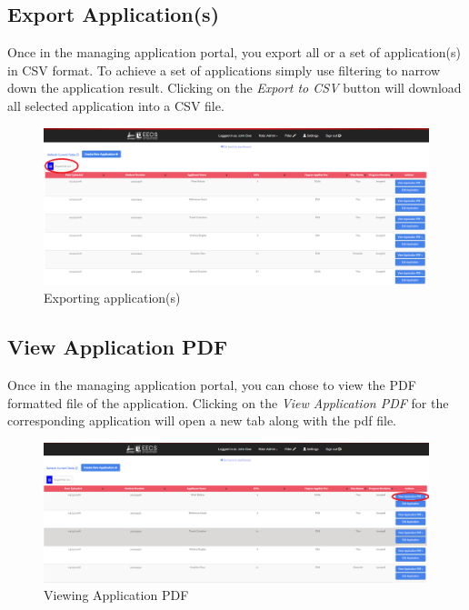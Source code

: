 \documentclass[fontsize=12pt,paper=letter,twoside]{scrartcl}
\begin{document}
\clearpage
\subsection{Export Application(s)}
Once in the managing application portal, you export all or a set of application(s) in CSV format. To achieve a set of applications simply use filtering to narrow down the application result. Clicking on the \emph{Export to CSV} button will download all selected application into a CSV file.

\begin{figure}[!htb]
\begin{center}
\includegraphics[width=.99\textwidth]{images/ma/export_appl.png}
\end{center}
\caption{Exporting application(s)}
\label{fig:export_appl}
\end{figure}

\clearpage
\subsection{View Application PDF}
Once in the managing application portal, you can chose to view the PDF formatted file of the application. Clicking on the \emph{View Application PDF} for the corresponding application will open a new tab along with the pdf file.

\begin{figure}[!htb]
\begin{center}
\includegraphics[width=.9\textwidth]{images/ma/view_appl_app.png}
\end{center}
\caption{Viewing Application PDF}
\label{fig:view_appl_app}
\end{figure}
\end{document}
